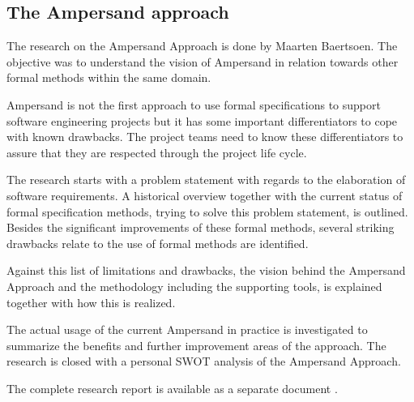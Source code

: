 

\subsection{The Ampersand approach}
\label{domain:approach}
The research on the Ampersand Approach is done by Maarten Baertsoen.
The objective was to understand the vision of Ampersand in relation towards other formal methods within the same domain.

Ampersand is not the first approach to use formal specifications to support software engineering projects but it has some important differentiators to cope with known drawbacks.
The project teams need to know these differentiators to assure that they are respected through the project life cycle.

The research starts with a problem statement with regards to the elaboration of software requirements.
A historical overview together with the current status of formal specification methods, trying to solve this problem statement, is outlined.
Besides the significant improvements of these formal methods, several striking drawbacks relate to the use of formal methods are identified.

Against this list of limitations and drawbacks, the vision behind the Ampersand Approach and the methodology including the supporting tools, is explained together with how this is realized.

The actual usage of the current Ampersand in practice is investigated to summarize the benefits and further improvement areas of the approach.
The research is closed with a personal SWOT analysis of the Ampersand Approach.

The complete research report is available as a separate document .
